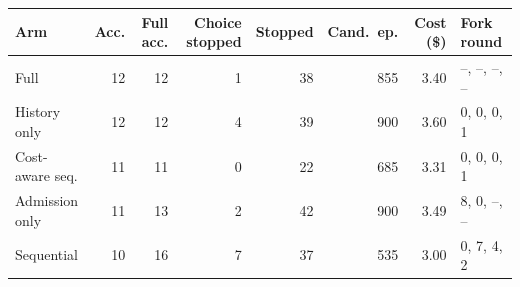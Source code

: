 \begin{tabular}{lrrrrrrl}
\toprule
Arm & Acc. & Full acc. & Choice stopped & Stopped & Cand.\ ep. & Cost (\$) & Fork round \\
\midrule
Full & 12 & 12 & 1 & 38 & 855 & 3.40 & --, --, --, -- \\
History only & 12 & 12 & 4 & 39 & 900 & 3.60 & 0, 0, 0, 1 \\
Cost-aware seq. & 11 & 11 & 0 & 22 & 685 & 3.31 & 0, 0, 0, 1 \\
Admission only & 11 & 13 & 2 & 42 & 900 & 3.49 & 8, 0, --, -- \\
Sequential & 10 & 16 & 7 & 37 & 535 & 3.00 & 0, 7, 4, 2 \\
\bottomrule
\end{tabular}
